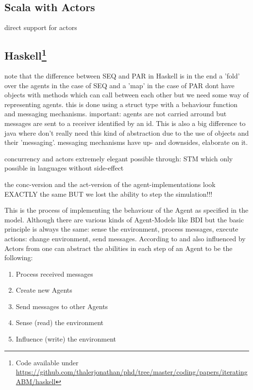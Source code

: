 \subsection{Scala with Actors}
direct support for actors

\subsection[Haskell]{Haskell\footnote{Code available under\\ \url{https://github.com/thalerjonathan/phd/tree/master/coding/papers/iteratingABM/haskell}}}
note that the difference between SEQ and PAR in Haskell is in the end a 'fold' over the agents in the case of SEQ and a 'map' in the case of PAR
dont have objects with methods which can call between each other but we need some way of representing agents. this is done using a struct type with a behaviour function and messaging mechanisms. important: agents are not carried arround but messages are sent to a receiver identified by an id. This is also a big difference to java where don't really need this kind of abstraction due to the use of objects and their 'messaging'. messaging mechanisms have up- and downsides, elaborate on it.

concurrency and actors extremely elegant possible through: STM which only possible in languages without side-effect	

the conc-version and the act-version of the agent-implementations look EXACTLY the same	 BUT we lost the ability to step the simulation!!!

This is the process of implementing the behaviour of the Agent as specified in the model. Although there are various kinds of Agent-Models like BDI but the basic principle is always the same: sense the environment, process messages, execute actions: change environment, send messages. According to \cite{wooldridge_introduction_2009} and also influenced by Actors from \cite{agha_actors:_1986} one can abstract the abilities in each step of an Agent to be the following:

\begin{enumerate}
\item Process received messages
\item Create new Agents
\item Send messages to other Agents
\item Sense (read) the environment
\item Influence (write) the environment
\end{enumerate}
